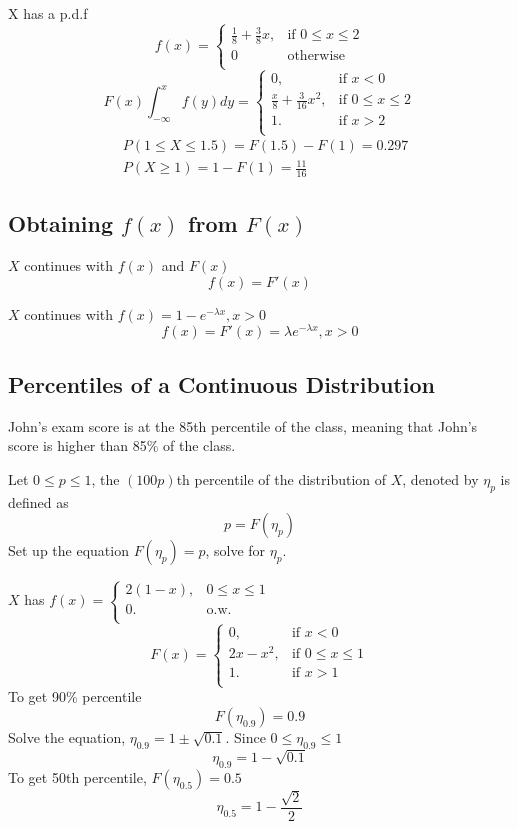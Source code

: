 \begin{exmp}
X has a p.d.f 
\[f(x)=\begin{cases}
\frac{1}{8}+\frac{3}{8}x, &\text{if } 0\leq x\leq 2\\
0&\text{otherwise}\\
\end{cases}\]
\[F(x)\int_{-\infty}^{x}f(y)dy=\begin{cases}
0,		&\text{if } x<0\\
\frac{x}{8}+\frac{3}{16}x^2, &\text{if } 0\leq x\leq 2\\
1.		&\text{if }x>2\\
\end{cases}\]
\begin{align*}
&P(1\leq X \leq 1.5)=F(1.5)-F(1)=0.297\\
&P(X\geq 1)=1-F(1)=\frac{11}{16}
\end{align*}
\end{exmp}

\subsection{Obtaining $f(x)$ from $F(x)$}
$X$ continues with $f(x)$ and $F(x)$
\[f(x)=F'(x)\]

\begin{exmp}
$X$ continues with $f(x)=1-e^{-\lambda x}, x>0$
\[f(x)=F'(x)= \lambda e^{-\lambda x}, x>0 \]
\end{exmp}

\subsection{Percentiles of a Continuous Distribution}
\begin{exmp}
John's exam score is at the 85th percentile of the class, meaning that John's score is higher than 85\% of the class.
\end{exmp}

\begin{defn}
Let $0 \leq p \leq 1$, the $(100p)$th percentile of the distribution of $X$, denoted by $\eta_p$ is defined as 
\[p=F(\eta_p)\]
Set up the equation $F(\eta_p)=p$, solve for $\eta_p$.
\end{defn}

\begin{exmp}
$X$ has $f(x)=\begin{cases}
2(1-x), & 0\leq x\leq 1\\
0.		&\text{o.w.}\\
\end{cases}$
\[F(x)=\begin{cases}
0,		&\text{if } x<0\\
2x-x^2, &\text{if } 0\leq x\leq 1\\
1.		&\text{if  }x>1\\
\end{cases}\]
To get 90\% percentile
\[F(\eta_{0.9})=0.9\]
Solve the equation, $\eta_{0.9}=1 \pm \sqrt{0.1}$. Since $0 \leq \eta_{0.9} \leq 1$
\[\eta_{0.9}=1 - \sqrt{0.1}\]
To get 50th percentile, $F(\eta_{0.5})=0.5$
\[\eta_{0.5}=1-\frac{\sqrt{2}}{2}\]
\end{exmp}

